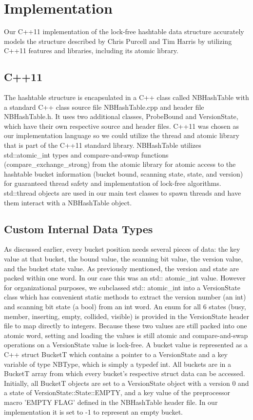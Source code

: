 \documentclass[journal]{IEEEtran}
\begin{document}
\section{Implementation}

Our C++11 implementation of the lock-free hashtable data structure accurately models the structure described by Chris Purcell and Tim Harris by utilizing C++11 features and libraries, including its atomic library.

\subsection{C++11}
The hashtable structure is encapsulated in a C++ class called NBHashTable with a standard C++ class source file NBHashTable.cpp and header file NBHashTable.h. It uses two additional classes, ProbeBound and VersionState, which have their own respective source and header files. C++11 was chosen as our implementation language so we could utilize the thread and atomic library that is part of the C++11 standard library. NBHashTable utilizes std::atomic\_int types and compare-and-swap functions (compare\_exchange\_strong) from the atomic library for atomic access to the hashtable bucket information (bucket bound, scanning state, state, and version) for guaranteed thread safety and implementation of lock-free algorithms. std::thread objects are used in our main test classes to spawn threads and have them interact with a NBHashTable object.

\subsection{Custom Internal Data Types}
As discussed earlier, every bucket position needs several pieces of data: the key value at that bucket, the bound value, the scanning bit value, the version value, and the bucket state value. As previously mentioned, the version and state are packed within one word. In our case this was an std:: atomic\_int value. However for organizational purposes, we subclassed std:: atomic\_int into a VersionState class which has convenient static methods to extract the version number (an int) and scanning bit state (a bool) from an int word. An enum for all 6 states (busy, member, inserting, empty, collided, visible) is provided in the VersionState header file to map directly to integers. Because these two values are still packed into one atomic word, setting and loading the values is still atomic and compare-and-swap operations on a VersionState value is lock-free.
 A bucket value is represented as a C++ struct BucketT which contains a pointer to a VersionState and a key variable of type NBType, which is simply a typedef int. All buckets are in a BucketT array from which every bucket’s respective struct data can be accessed. Initially, all BucketT objects are set to a VersionState object with a version 0 and a state of VersionState::State::EMPTY, and a key value of the preprocessor macro ’EMPTY FLAG’ defined in the NBHashTable header file. In our implementation it is set to -1 to represent an empty bucket.
 
\end{document}
